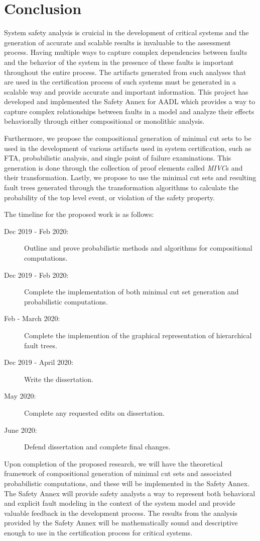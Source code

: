 \chapter{Conclusion}
System safety analysis is cruicial in the development of critical systems and the generation of accurate and scalable results is invaluable to the assessment process. Having multiple ways to capture complex dependencies between faults and the behavior of the system in the presence of these faults is important throughout the entire process. The artifacts generated from such analyses that are used in the certification process of such systems must be generated in a scalable way and provide accurate and important information. This project has developed and implemented the Safety Annex for AADL which provides a way to capture complex relationships between faults in a model and analyze their effects behaviorally through either compositional or monolithic analysis. 

Furthermore, we propose the compositional generation of minimal cut sets to be used in the development of various artifacts used in system certification, such as FTA, probabilistic analysis, and single point of failure examinations. This generation is done through the collection of proof elements called \textit{MIVC}s and their transformation. Lastly, we propose to use the minimal cut sets and resulting fault trees generated through the transformation algorithms to calculate the probability of the top level event, or violation of the safety property.   

The timeline for the proposed work is as follows:
\begin{description}
\item[Dec 2019 - Feb 2020:]  Outline and prove probabilistic methods and algorithms for compositional computations.
\item[Dec 2019 - Feb 2020:] Complete the implementation of both minimal cut set generation and probabilistic computations.  
\item[Feb - March 2020:]   Complete the implemention of the graphical representation of hierarchical fault trees.
\item[Dec 2019 - April 2020:]  Write the dissertation.
\item[May 2020:]  Complete any requested edits on dissertation.
\item[June 2020:]  Defend dissertation and complete final changes. 
\end{description}

Upon completion of the proposed research, we will have the theoretical framework of compositional generation of minimal cut sets and associated probabilistic computations, and these will be implemented in the Safety Annex. The Safety Annex will provide safety analysts a way to represent both behavioral and explicit fault modeling in the context of the system model and provide valuable feedback in the development process. The results from the analysis provided by the Safety Annex will be mathematically sound and descriptive enough to use in the certification process for critical systems. 